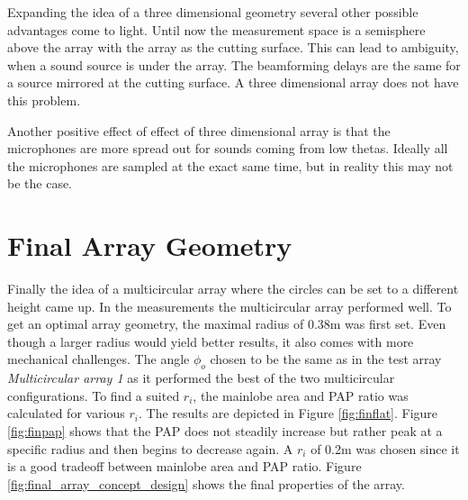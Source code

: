Expanding the idea of a three dimensional geometry several other
possible advantages come to light.
Until now the measurement space is a semisphere above the array with the array as the cutting surface.
This can lead to ambiguity, when a sound source is under the array.
The beamforming delays are the same for a source mirrored at the cutting surface.
A three dimensional array does not have this problem.

Another positive effect of effect of three dimensional array is
that the microphones are more spread out for sounds 
coming from low thetas.
Ideally all the microphones are sampled at the exact same time, but in 
reality this may not be the case.


\newpage
\section{Final Array Geometry} \label{sec:final_array_geometry}
Finally the idea of a multicircular array where the circles can be 
set to a different height came up.
In the measurements the multicircular array performed well. 
To get an optimal array geometry, the maximal radius of 0.38m was first set.
Even though a larger radius would yield better results, it also
comes with more mechanical challenges.
The angle $\phi_o$ chosen to be the same as in the test array
\textit{Multicircular array 1} as it performed the best of the two multicircular 
configurations.
To find a suited $r_i$, the mainlobe area and PAP ratio was calculated for
various $r_i$.
The results are depicted in Figure \ref*{fig:finflat}.
Figure \ref{fig:finpap} shows that the PAP does not 
steadily increase but rather peak at a specific radius and then
begins to decrease again.
A $r_i$ of 0.2m was chosen since it is a good tradeoff between 
mainlobe area and PAP ratio.
Figure \ref*{fig:final_array_concept_design} shows the final
properties of the array.

